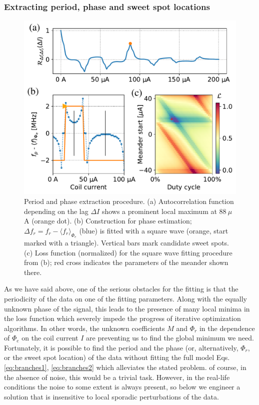 \documentclass[%
 aip,
 amsmath,amssymb,
 reprint,%
]{revtex4-1}
\begin{document}
\subsubsection{Extracting period, phase and sweet spot locations}
\begin{figure}
\centering
\includegraphics[width=\linewidth]{per+phase}
\caption{Period and phase extraction procedure. (a) Autocorrelation function depending on the lag $\Delta I$ shows a prominent local maximum at $88\ \mu$A (orange dot). (b) Construction for phase estimation; $\Delta f_r = f_r-\langle f_r \rangle_{\Phi_e}$ (blue) is fitted with a square wave (orange, start marked with a triangle). Vertical bars mark candidate sweet spots. (c) Loss function (normalized) for the square wave fitting procedure from (b); red cross indicates the parameters of the meander shown there.}
\label{fig:per+phase}
\end{figure}
As we have said above, one of the serious obstacles for the fitting is that the periodicity of the data on one of the fitting parameters. Along with the equally unknown phase of the signal, this leads to the presence of many local minima in the loss function which severely impede the progress of iterative optimization algorithms. In other words, the unknown coefficients $M$ and $\Phi_r$ in the dependence of $\Phi_e$ on the coil current $I$ are preventing us to find the global minimum we need. Fortunately, it is possible to find the period and the phase (or, alternatively, $\Phi_r$, or the sweet spot location) of the data without fitting the full model Eqs. \eqref{eq:branches1}, \eqref{eq:branches2} which alleviates the stated problem. of course, in the absence of noise, this would be a trivial task. However, in the real-life conditions the noise to some extent is always present, so below we engineer a solution that is insensitive to local sporadic perturbations of the data.
\end{document}
